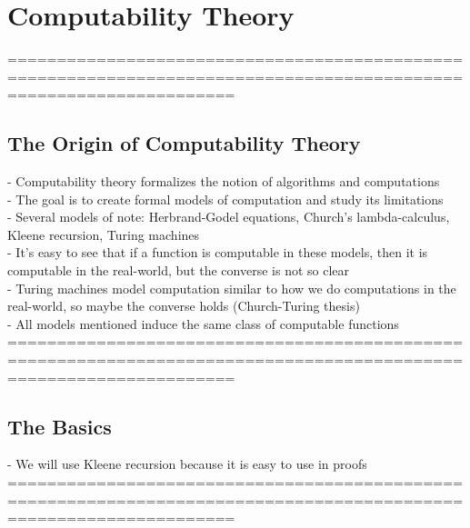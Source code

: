 \documentclass{book}
\begin{document}
\chapter{Computability Theory}
	===================================================================================================================
\section{The Origin of Computability Theory} %
	- Computability theory formalizes the notion of algorithms and computations \\
	- The goal is to create formal models of computation and study its limitations \\
	- Several models of note: Herbrand-Godel equations, Church's lambda-calculus, Kleene recursion, Turing machines \\
	- It's easy to see that if a function is computable in these models, then it is computable in the real-world, but the converse is not so clear \\
	- Turing machines model computation similar to how we do computations in the real-world, so maybe the converse holds (Church-Turing thesis) \\
	- All models mentioned induce the same class of computable functions \\
	===================================================================================================================
\section{The Basics} %
		- We will use Kleene recursion because it is easy to use in proofs \\
	===================================================================================================================
\end{document}
